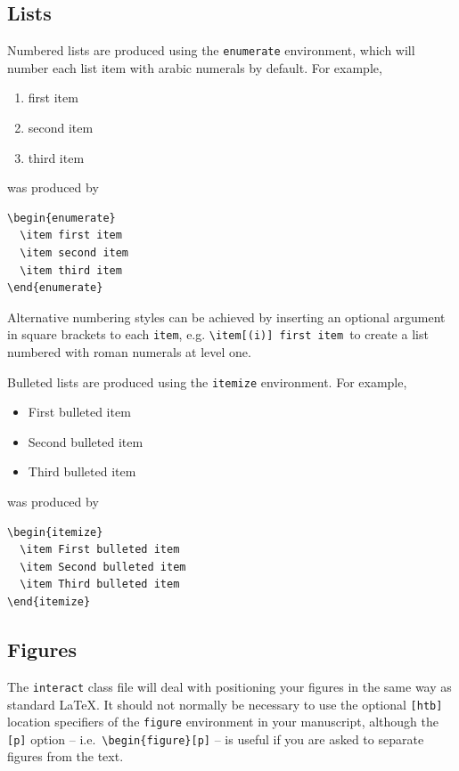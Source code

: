 \documentclass[]{interact}
\theoremstyle{plain}%
\theoremstyle{definition}
\theoremstyle{remark}
\begin{document}
\subsection{Lists}

Numbered lists are produced using the \texttt{enumerate} environment, which will number each list item with arabic numerals by default. For example,
\begin{enumerate}
  \item first item
  \item second item
  \item third item
\end{enumerate}
was produced by
\begin{verbatim}
\begin{enumerate}
  \item first item
  \item second item
  \item third item
\end{enumerate}
\end{verbatim}
Alternative numbering styles can be achieved by inserting an optional argument in square brackets to each \verb"item", e.g. \verb"\item[(i)] first item"\, to create a list numbered with roman numerals at level one.

Bulleted lists are produced using the \texttt{itemize} environment. For example,
\begin{itemize}
  \item First bulleted item
  \item Second bulleted item
  \item Third bulleted item
\end{itemize}
was produced by
\begin{verbatim}
\begin{itemize}
  \item First bulleted item
  \item Second bulleted item
  \item Third bulleted item
\end{itemize}
\end{verbatim}


\subsection{Figures}

The \texttt{interact} class file will deal with positioning your figures in the same way as standard \LaTeX. It should not normally be necessary to use the optional \texttt{[htb]} location specifiers of the \texttt{figure} environment in your manuscript, although the \texttt{[p]} option -- i.e.\ \verb"\begin{figure}[p]" -- is useful if you are asked to separate figures from the text.
\end{document}
